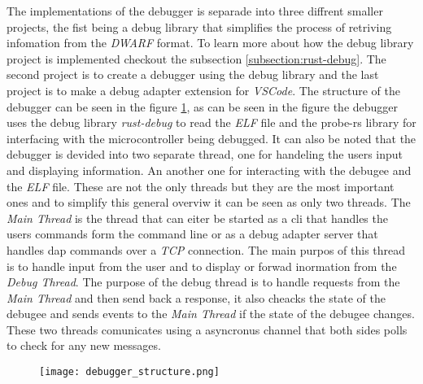  

The implementations of the debugger is separade into three diffrent smaller projects, the fist being a debug library that simplifies the process of retriving infomation from the \emph{DWARF} format.
To learn more about how the debug library project is implemented checkout the subsection \ref{subsection:rust-debug}.
The second project is to create a debugger using the debug library and the last project is to make a debug adapter extension for \emph{VSCode}.
The structure of the debugger can be seen in the figure \ref{fig:EDBStruct}, as can be seen in the figure the debugger uses the debug library \emph{rust-debug} to read the \emph{ELF} file and the probe-rs library for interfacing with the microcontroller being debugged.
It can also be noted that the debugger is devided into two separate thread, one for handeling the users input and displaying information.
An another one for interacting with the \gls{debugee} and the \emph{ELF} file.
These are not the only threads but they are the most important ones and to simplify this general overviw it can be seen as only two threads.
The \emph{Main Thread} is the thread that can eiter be started as a cli that handles the users commands form the command line or as a debug adapter server that handles \acrshort{dap} commands over a \emph{TCP} connection.
The main purpos of this thread is to handle input from the user and to display or forwad inormation from the \emph{Debug Thread}.
The purpose of the debug thread is to handle requests from the \emph{Main Thread} and then send back a response, it also cheacks the state of the \gls{debugee} and sends events to the \emph{Main Thread} if the state of the debugee changes.
These two threads comunicates using a asyncronus channel that both sides polls to check for any new messages.


\begin{figure}[h]
    \centering
    \texttt{[image: debugger\_structure.png]}
    \label{fig:EDBStruct}
\end{figure}



